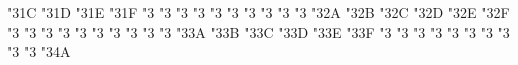 {  \mathchardef\preceqq              "3\hex\txsycfam 1C
  \mathchardef\succeqq              "3\hex\txsycfam 1D
  \mathchardef\nprecsim             "3\hex\txsycfam 1E
  \mathchardef\nsuccsim             "3\hex\txsycfam 1F
  \mathchardef\nlesssim             "3\hex{}
  \mathchardef\ngtrsim              "3\hex{}
  \mathchardef\nlessapprox          "3\hex{}
  \mathchardef\ngtrapprox           "3\hex{}
  \mathchardef\npreccurlyeq         "3\hex{}
  \mathchardef\nsucccurlyeq         "3\hex{}
  \mathchardef\ngtrless             "3\hex{}
  \mathchardef\nlessgtr             "3\hex{}
  \mathchardef\nbumpeq              "3\hex{}
  \mathchardef\nBumpeq              "3\hex{}
  \mathchardef\nbacksim             "3\hex\txsycfam 2A
  \mathchardef\nbacksimeq           "3\hex\txsycfam 2B
  \mathchardef\neq                  "3\hex\txsycfam 2C
  \let\ne=\neq
  \mathchardef\nasymp               "3\hex\txsycfam 2D
  \mathchardef\nequiv               "3\hex\txsycfam 2E
  \mathchardef\nsim                 "3\hex\txsycfam 2F
  \mathchardef\napprox              "3\hex{}
  \mathchardef\nsubset              "3\hex{}
  \mathchardef\nsupset              "3\hex{}
  \mathchardef\nll                  "3\hex{}
  \mathchardef\ngg                  "3\hex{}
  \mathchardef\nthickapprox         "3\hex{}
  \mathchardef\napproxeq            "3\hex{}
  \mathchardef\nprecapprox          "3\hex{}
  \mathchardef\nsuccapprox          "3\hex{}
  \mathchardef\npreceqq             "3\hex{}
  \mathchardef\nsucceqq             "3\hex\txsycfam 3A
  \mathchardef\nsimeq               "3\hex\txsycfam 3B
  \mathchardef\notin                "3\hex\txsycfam 3C
  \mathchardef\notni                "3\hex\txsycfam 3D
   \let\notowns=\notni
  \mathchardef\nSubset              "3\hex\txsycfam 3E
  \mathchardef\nSupset              "3\hex\txsycfam 3F
  \mathchardef\nsqsubseteq          "3\hex{}
  \mathchardef\nsqsupseteq          "3\hex{}
  \mathchardef\coloneqq             "3\hex{}
  \mathchardef\eqqcolon             "3\hex{}
  \mathchardef\coloneq              "3\hex{}
  \mathchardef\eqcolon              "3\hex{}
  \mathchardef\Coloneqq             "3\hex{}
  \mathchardef\Eqqcolon             "3\hex{}
  \mathchardef\Coloneq              "3\hex{}
  \mathchardef\Eqcolon              "3\hex{}
  \mathchardef\strictif             "3\hex\txsycfam 4A
}
